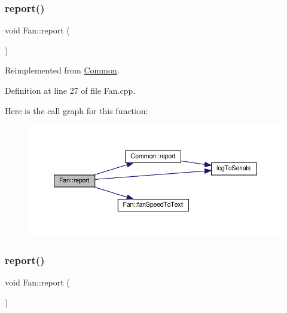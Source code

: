 \subsubsection{\texorpdfstring{report()}{report()}\hspace{0.1cm}{\footnotesize\ttfamily [1/2]}}
{\footnotesize\ttfamily void Fan\+::report (\begin{DoxyParamCaption}{ }\end{DoxyParamCaption})\hspace{0.3cm}{\ttfamily [virtual]}}



Reimplemented from \hyperlink{class_common_a9e60e2c26a5f4d72342a59a969954636}{Common}.



Definition at line 27 of file Fan.\+cpp.

Here is the call graph for this function\+:
\nopagebreak
\begin{figure}[H]
\begin{center}
\leavevmode
\includegraphics[width=350pt]{class_fan_a7f1ba729d418cc2109199b2392c37902_cgraph}
\end{center}
\end{figure}
\mbox{\label{class_fan_a7f1ba729d418cc2109199b2392c37902}} 
\subsubsection{\texorpdfstring{report()}{report()}\hspace{0.1cm}{\footnotesize\ttfamily [2/2]}}
{\footnotesize\ttfamily void Fan\+::report (\begin{DoxyParamCaption}{ }\end{DoxyParamCaption})\hspace{0.3cm}{\ttfamily [virtual]}}



